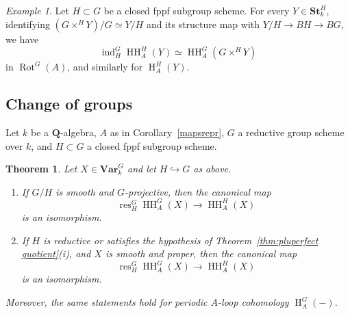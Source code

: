 \documentclass[12pt, oneside]{amsart}
\numberwithin{equation}{section}
\newtheorem{theorem}[subsubsection]{Theorem}
\theoremstyle{remark}
\newtheorem{example}[subsubsection]{Example}
\theoremstyle{plain}
\newcommand{\bQ}{\mathbf{Q}}
\newcommand{\Stk}{\mathbf{St}_{k}}
\newcommand{\Var}{\mathbf{Var}_{k}}
\newcommand{\HH}{\operatorname{HH}}
\newcommand{\Hcoh}{\operatorname{H}}
\newcommand{\Rot}{\operatorname{Rot}}
\begin{document}
\begin{example}\label{exam:ind_H^G HH}
	Let $H \subset G$ be a closed fppf subgroup scheme.
	For every $Y \in \Stk^H$, identifying $(G \times^H Y)/G \simeq Y/H$ and its structure map with $Y/H \to BH \to BG$, we have
	\[
	  \operatorname{ind}^G_H \HH_A^H(Y) \simeq \HH_A^G(G \times^H Y)
	\]
	in $\Rot^G(A)$, and similarly for $\Hcoh_A^H(Y)$.
\end{example}

\subsection{Change of groups}

Let $k$ be a $\bQ$-algebra, $A$ as in Corollary~\ref{mapsrepr}, $G$ a reductive group scheme over $k$, and $H \subset G$ a closed fppf subgroup scheme.

\begin{theorem}\label{thm:change of groups}
Let $X \in \Var^G$ and let $H\hookrightarrow G$ as above.
\begin{enumerate}
\item If $G/H$ is smooth and $G$-projective, then the canonical map $$\operatorname{res}^G_H\HH_A^G(X)\longrightarrow \HH_A^H(X)$$ is an isomorphism.

\item If $H$ is reductive or satisfies the hypothesis of Theorem~\ref{thm:pluperfect quotient}(i), and $X$ is smooth and proper, then the canonical map $$\operatorname{res}^G_H\HH_A^G(X)\longrightarrow \HH^H_A(X)$$ is an isomorphism.
\end{enumerate}
Moreover, the same statements hold for periodic $A$-loop cohomology $\Hcoh_A^G(-)$. \end{theorem}
\end{document}
